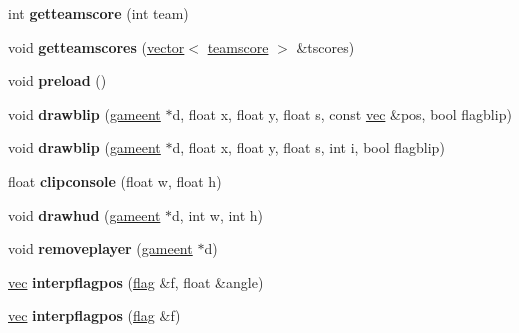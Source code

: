 \begin{DoxyCompactItemize}
int {\bfseries getteamscore} (int team)
\item 
\mbox{\label{structctfclientmode_a9ec053925cf13ee85655cbe67db87ac7}} 
void {\bfseries getteamscores} (\hyperlink{structvector}{vector}$<$ \hyperlink{structteamscore}{teamscore} $>$ \&tscores)
\item 
\mbox{\label{structctfclientmode_ac3847c805983e649a11ae5e0c714ff7b}} 
void {\bfseries preload} ()
\item 
\mbox{\label{structctfclientmode_a79a328ae1dcc585380eaaa675b09b4a2}} 
void {\bfseries drawblip} (\hyperlink{structgameent}{gameent} $\ast$d, float x, float y, float s, const \hyperlink{structvec}{vec} \&pos, bool flagblip)
\item 
\mbox{\label{structctfclientmode_a852c2c18cdd6aeda27ef19943e0e1f25}} 
void {\bfseries drawblip} (\hyperlink{structgameent}{gameent} $\ast$d, float x, float y, float s, int i, bool flagblip)
\item 
\mbox{\label{structctfclientmode_aa3fc0c95fa484dd9407a8d901411c3f6}} 
float {\bfseries clipconsole} (float w, float h)
\item 
\mbox{\label{structctfclientmode_a6592ac7a3f09f9b7f0287e7c742afc66}} 
void {\bfseries drawhud} (\hyperlink{structgameent}{gameent} $\ast$d, int w, int h)
\item 
\mbox{\label{structctfclientmode_ac7c716d3c3fe13bb9362089afb10a4ef}} 
void {\bfseries removeplayer} (\hyperlink{structgameent}{gameent} $\ast$d)
\item 
\mbox{\label{structctfclientmode_a0481b45a5094f51e819cf2ee1a91ee58}} 
\hyperlink{structvec}{vec} {\bfseries interpflagpos} (\hyperlink{structctfclientmode_1_1flag}{flag} \&f, float \&angle)
\item 
\mbox{\label{structctfclientmode_af0219e522caf947e06e43af9ad93892c}} 
\hyperlink{structvec}{vec} {\bfseries interpflagpos} (\hyperlink{structctfclientmode_1_1flag}{flag} \&f)
\item 
\mbox{\label{structctfclientmode_a9bba577b8062a222922dd926e2040f06}} 

\end{DoxyCompactItemize}
